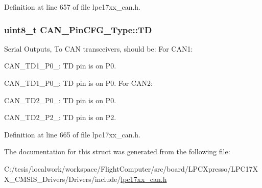 \-Definition at line 657 of file lpc17xx\-\_\-can.\-h.

\hypertarget{struct_c_a_n___pin_c_f_g___type_a4ecc42cecab7fc4af5b841614ac57ab4}{
\subsubsection[{\-T\-D}]{\setlength{\rightskip}{0pt plus 5cm}uint8\-\_\-t {\bf \-C\-A\-N\-\_\-\-Pin\-C\-F\-G\-\_\-\-Type\-::\-T\-D}}}\label{struct_c_a_n___pin_c_f_g___type_a4ecc42cecab7fc4af5b841614ac57ab4}
\-Serial \-Outputs, \-To \-C\-A\-N transceivers, should be\-: \-For \-C\-A\-N1\-:
\begin{DoxyItemize}
\item \-C\-A\-N\-\_\-\-T\-D1\-\_\-\-P0\-\_\-: \-T\-D pin is on \-P0.
\item \-C\-A\-N\-\_\-\-T\-D1\-\_\-\-P0\-\_\-: \-T\-D pin is on \-P0. \-For \-C\-A\-N2\-:
\item \-C\-A\-N\-\_\-\-T\-D2\-\_\-\-P0\-\_\-: \-T\-D pin is on \-P0.
\item \-C\-A\-N\-\_\-\-T\-D2\-\_\-\-P2\-\_\-: \-T\-D pin is on \-P2. 
\end{DoxyItemize}

\-Definition at line 665 of file lpc17xx\-\_\-can.\-h.



\-The documentation for this struct was generated from the following file\-:\begin{DoxyCompactItemize}
\item 
\-C\-:/tesis/localwork/workspace/\-Flight\-Computer/src/board/\-L\-P\-C\-Xpresso/\-L\-P\-C17\-X\-X\-\_\-\-C\-M\-S\-I\-S\-\_\-\-Drivers/\-Drivers/include/\hyperlink{lpc17xx__can_8h}{lpc17xx\-\_\-can.\-h}\end{DoxyCompactItemize}
